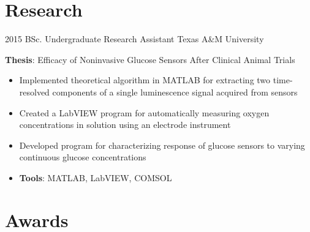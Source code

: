 \documentclass[letterpaper]{twentysecondcv} %
\begin{document}
\section{Research}
\begin{twenty}
	\twentyitem
    	{2015}
		{}
        {BSc. Undergraduate Research Assistant}
        {{Texas A\&M University}}
        {}
        {
       	\textbf{Thesis}: Efficacy of Noninvasive Glucose Sensors After Clinical Animal Trials
        {\begin{itemize}
        \item Implemented theoretical algorithm in MATLAB for extracting two time-resolved components of a single luminescence signal acquired from sensors
        \item Created a LabVIEW program for automatically measuring oxygen concentrations in solution using an electrode instrument
        \item Developed program for characterizing response of glucose sensors to varying continuous glucose concentrations 
        \item \textbf{Tools}: MATLAB, LabVIEW, COMSOL \vspace{2mm}
		\end{itemize}}
        }
\end{twenty}
\section{Awards}
\begin{twenty}
\end{twenty}
\end{document}
